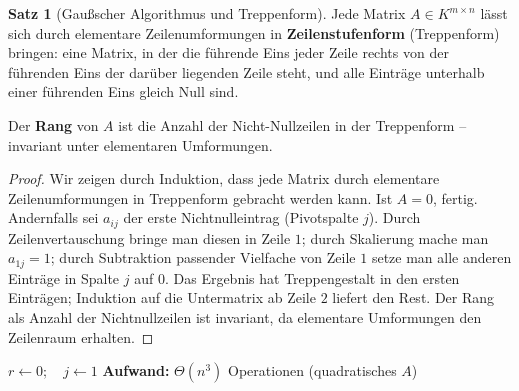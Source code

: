 ﻿\documentclass[a4paper,12pt]{report}
\theoremstyle{definition}
\newtheorem{satz}{Satz}
\begin{document}
\begin{satz}[Gaußscher Algorithmus und Treppenform]
    Jede Matrix $A \in K^{m \times n}$ lässt sich durch elementare
    Zeilenumformungen in \textbf{Zeilenstufenform} (Treppenform) bringen:
    eine Matrix, in der die führende Eins jeder Zeile rechts von der
    führenden Eins der darüber liegenden Zeile steht, und alle Einträge
    unterhalb einer führenden Eins gleich Null sind.

    Der \textbf{Rang} von $A$ ist die Anzahl der Nicht-Nullzeilen in der
    Treppenform -- invariant unter elementaren Umformungen.
\end{satz}
\begin{proof}
    Wir zeigen durch Induktion, dass jede Matrix durch elementare Zeilenumformungen
    in Treppenform gebracht werden kann.
    Ist $A = 0$, fertig. Andernfalls sei $a_{ij}$ der erste Nichtnulleintrag (Pivotspalte $j$).
    Durch Zeilenvertauschung bringe man diesen in Zeile $1$; durch Skalierung
    mache man $a_{1j} = 1$; durch Subtraktion passender Vielfache von Zeile $1$
    setze man alle anderen Einträge in Spalte $j$ auf $0$. Das Ergebnis hat
    Treppengestalt in den ersten Einträgen; Induktion auf die Untermatrix ab
    Zeile $2$ liefert den Rest.
    Der Rang als Anzahl der Nichtnullzeilen ist invariant, da elementare
    Umformungen den Zeilenraum erhalten.
\end{proof}


\begin{algorithm}[H]
\DontPrintSemicolon
\caption{Gaußscher Algorithmus}\label{alg:gauss}
$r \leftarrow 0;\quad j \leftarrow 1$\;
\;
\BlankLine
\textbf{Aufwand:} $\Theta(n^3)$ Operationen (quadratisches $A$)
\end{algorithm}
\end{document}

